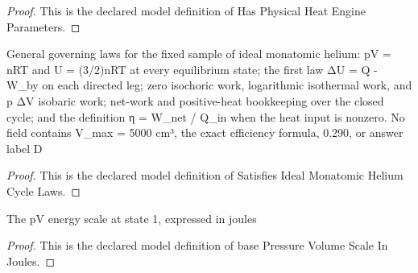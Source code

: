 \begin{proof}
  This is the declared model definition of Has Physical Heat Engine Parameters.
\end{proof}
\begin{definition}
  \label{def:physics:phyx-mini-0432:phyxminiproblems-problemphyxmini0432-satisfiesidealmonatomicheliumcyclelaws}
  General governing laws for the fixed sample of ideal monatomic helium: pV = nRT and U = (3/2)nRT at every equilibrium state; the first law ΔU = Q - W\_by on each directed leg; zero isochoric work, logarithmic isothermal work, and p ΔV isobaric work; net-work and positive-heat bookkeeping over the closed cycle; and the definition η = W\_net / Q\_in when the heat input is nonzero. No field contains V\_max = 5000 cm³, the exact efficiency formula, 0.290, or answer label D
\end{definition}
\begin{proof}
  This is the declared model definition of Satisfies Ideal Monatomic Helium Cycle Laws.
\end{proof}
\begin{definition}
  \label{def:physics:phyx-mini-0432:phyxminiproblems-problemphyxmini0432-basepressurevolumescaleinjoules}
  The pV energy scale at state 1, expressed in joules
\end{definition}
\begin{proof}
  This is the declared model definition of base Pressure Volume Scale In Joules.
\end{proof}

